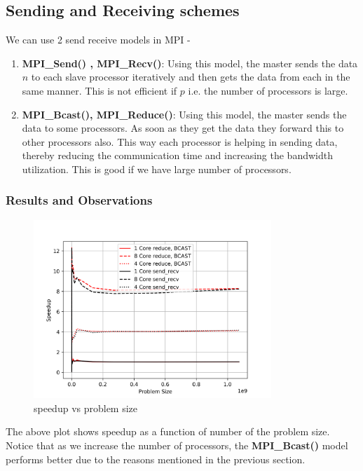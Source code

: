 \documentclass[12,a4paper]{article}
\begin{document}
    \subsection{Sending and Receiving schemes}
    We can use 2 send receive models in MPI -
    \begin{enumerate}
        \item \textbf{MPI\_Send() , MPI\_Recv()}: Using this model, the master sends the data $n$ to each slave processor iteratively and then gets the data from each in the same manner. This is not efficient if $p$ i.e. the number of processors is large.
        \item \textbf{MPI\_Bcast(), MPI\_Reduce()}: Using this model, the master sends the data to some processors. As soon as they get the data they forward this to other processors also. This way each processor is helping in sending data, thereby reducing the communication time and increasing the bandwidth utilization. This is good if we have large number of processors.
    \end{enumerate}
    \subsubsection{Results and Observations}
    
    \begin{figure}[H]
        \centering
        \includegraphics[width=0.8\textwidth]{plots/speedup_size.png}
        \caption{speedup vs problem size}
        \label{fig:q1p1}
    \end{figure}
    
    The above plot shows speedup as a function of number of the problem size. Notice that as we increase the number of processors, the \textbf{MPI\_Bcast()} model performs better due to the reasons mentioned in the previous section.
    
\end{document}
